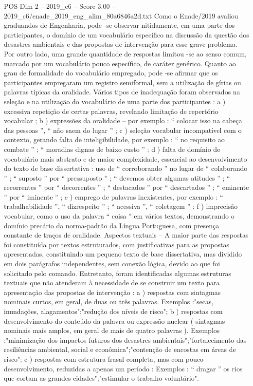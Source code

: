 \begin{textsample}{POS Dim 2 – 2019\_c6 – Score 3.00 – 2019\_c6/enade\_2019\_eng\_alim\_80a6846a2d.txt}
Como o Enade/2019 avaliou graduandos de Engenharia, pode -se observar nitidamente, em uma parte dos participantes, o domínio de um vocabulário específico na discussão da questão dos desastres ambientais e das propostas de intervenção para esse grave problema.
Por outro lado, uma grande quantidade de respostas limitou -se ao senso comum, marcado por um vocabulário pouco específico, de caráter genérico.
Quanto ao grau de formalidade do vocabulário empregado, pode -se afirmar que os participantes empregaram um registro semiformal, sem a utilização de gírias ou palavras típicas da oralidade.
Vários tipos de inadequação foram observados na seleção e na utilização do vocabulário de uma parte dos participantes : a ) excessiva repetição de certas palavras, revelando limitação de repertório vocabular ; b ) expressões da oralidade – por exemplo : “ colocar isso na cabeça das pessoas ”, “ não saem do lugar ” ; c ) seleção vocabular incompatível com o contexto, gerando falta de inteligibilidade, por exemplo : “ no requisito ao combate ” ; “ moradias dignas de baixo custo ” ; d ) falta de domínio de vocabulário mais abstrato e de maior complexidade, essencial ao desenvolvimento do texto de base dissertativa : uso de “ corroborando ” no lugar de “ colaborando ” ; “ suposto ” por “ pressuposto ” ; “ devemos obter algumas atitudes ” ; “ recorrentes ” por “ decorrentes ” ; “ destacados ” por “ descartados ” ; “ eminente ” por “ iminente ” ; e ) emprego de palavras inexistentes, por exemplo : “ trabalhabilidade ”, “ dizrespeito ” ; “ acessiva ”, “ coletagem ” ; f ) imprecisão vocabular, como o uso da palavra “ coisa ” em vários textos, demonstrando o domínio precário da norma-padrão da Língua Portuguesa, com presença constante de traços de oralidade.
Aspectos textuais – A maior parte das respostas foi constituída por textos estruturados, com justificativas para as propostas apresentadas, constituindo um pequeno texto de base dissertativa, mas dividido em dois parágrafos independentes, sem conexão lógica, devido ao que foi solicitado pelo comando.
Entretanto, foram identificadas algumas estruturas textuais que não atenderam à necessidade de se construir um texto para apresentação das propostas de intervenção : a ) respostas com sintagmas nominais curtos, em geral, de duas ou três palavras.
Exemplos :"secas, inundações, alagamentos";"redução dos níveis de risco"; b ) respostas com desenvolvimento do conteúdo da palavra ou expressão nuclear ( sintagmas nominais mais amplos, em geral de mais de quatro palavras ).
Exemplos :"minimização dos impactos futuros dos desastres ambientais";"fortalecimento das resiliências ambiental, social e econômica";"contenção de encostas em áreas de risco"; c ) respostas com estrutura frasal completa, mas com pouco desenvolvimento, reduzidas a apenas um período : Exemplos : “ dragar ” os rios que cortam as grandes cidades";"estimular o trabalho voluntário".

\end{textsample}
